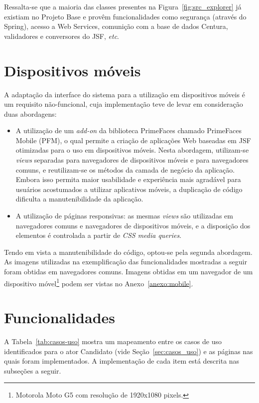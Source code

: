 \documentclass[
  10.5pt,				  %
	openright,			%
	twoside,			  %
  a5paper,
  chapter=TITLE,	%
	section=TITLE,	%
  hyphens,        %
	english,        %
	brazil          %
]{abntex2}
\begin{document}
Ressalta-se que a maioria das classes presentes na Figura~\ref{fig:src_explorer} já existiam no Projeto Base e provêm funcionalidades como segurança (através do Spring), acesso a Web Services, comunição com a base de dados Centura, validadores e conversores do JSF, \emph{etc}.


\section{Dispositivos móveis}\label{sec:mobile}

A adaptação da interface do sistema para a utilização em dispositivos móveis é um requisito não-funcional, cuja implementação teve de levar em consideração duas abordagens:

\begin{itemize}
  \item A utilização de um \emph{add-on} da biblioteca PrimeFaces chamado PrimeFaces Mobile (PFM), o qual permite a criação de aplicações Web baseadas em JSF otimizadas para o uso em dispositivos móveis. Nesta abordagem, utilizam-se \emph{views} separadas para navegadores de dispositivos móveis e para navegadores comuns, e reutilizam-se os métodos da camada de negócio da aplicação. Embora isso permita maior usabilidade e experiência mais agradável para usuários acostumados a utilizar aplicativos móveis, a duplicação de código dificulta a manutenibilidade da aplicação.
  \item A utilização de páginas responsivas: as mesmas \emph{views} são utilizadas em navegadores comuns e navegadores de dispositivos móveis, e a disposição dos elementos é controlada a partir de \emph{CSS media queries}.
\end{itemize}
%
Tendo em vista a manutenibilidade do código, optou-se pela segunda abordagem. As imagens utilizadas na exemplificação das funcionalidades mostradas a seguir foram obtidas em navegadores comuns. Imagens obtidas em um navegador de um dispositivo móvel\footnote{Motorola Moto G5 com resolução de 1920x1080 pixels.} podem ser vistas no Anexo~\ref{anexo:mobile}.


\section{Funcionalidades}\label{sec:funcionalidades}

A Tabela~\ref{tab:casos-uso} mostra um mapeamento entre os casos de uso identificados para o ator Candidato (vide Seção~\ref{sec:casos_uso}) e as páginas nas quais foram implementados. A implementação de cada item está descrita nas subseções a seguir.
\end{document}
